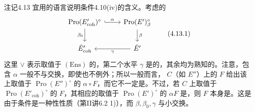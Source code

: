 \begin{SGAresult}{注记}{4.13}
宜用的语言说明条件4.10(iv)的含义。考虑的
\begin{equation}
\begin{tikzcd}
\operatorname{Pro}(E'_{\mathrm{coh}})^{\circ}\arrow[r,hook,"\alpha"]\arrow[d,"\beta_0"']&
\operatorname{Pro}(E')^{\circ}_{\beta}\arrow[d,"\beta"]\\
\check E'_{\mathrm{coh}}&\check E'\arrow[l,"\gamma"]
\end{tikzcd}\tag{4.13.1}
\end{equation}
这里 $\vee$ 表示取值于 $(\mathrm{Ens})$ 的，第二个水平 $\gamma$ 是的，其余均为熟知的。注意，包含 $\alpha$ 一般不与交换，即使也不例外；所以一般而言， $C$（如 $E''$）上的 $F$ 给出该上取值于 $\operatorname{Pro}(E'')^{\circ}$ 的 $\alpha\circ F$，而它不一定是。不过，若 $C$ 上取值于 $\operatorname{Pro}(E'_{\mathrm{coh}})^{\circ}$ 的 $F$，其相应的取值于 $\operatorname{Pro}(E')^{\circ}$ 的 $\alpha F$ 是，则 $F$ 本身是。这是由于条件是一种性性质（第II讲6.2 1)），而 $\beta,\beta_0,\gamma$ 与小交换。


\end{SGAresult}
